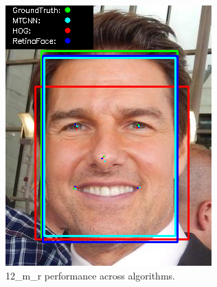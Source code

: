 \documentclass{l4proj}
\begin{document}
\begin{appendices}
\begin{figure}[h!]
  \centering
  \begin{minipage}{0.49\textwidth}
    \centering
     \includegraphics[width=\textwidth]{images/appendix/12.png}
    \caption{12\_m\_r performance across algorithms.}
    \label{whoopi_result}
  \end{minipage}
    \hfill
    \begin{minipage}{0.49\textwidth}
    \centering

\end{minipage}
\end{figure}
\end{appendices}
\end{document}

